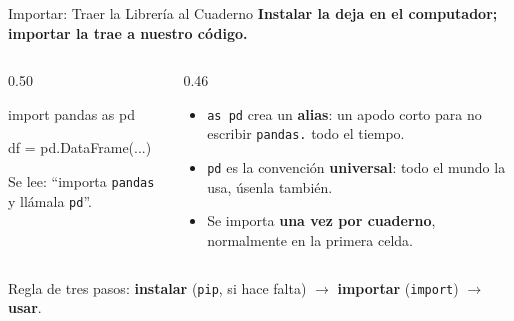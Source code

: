 \documentclass[aspectratio=169, 11pt]{beamer}
\begin{document}
\begin{frame}[fragile,shrink=10]{Importar: Traer la Librería al Cuaderno}
  \vspace{-4pt}
  {\small\color{arcaDark}\bfseries
    Instalar la deja en el computador; \textbf{importar} la trae a nuestro código.}

  \vspace{6pt}
  \begin{columns}[T]
    \begin{column}{0.50\textwidth}
      \begin{pyblock}
import pandas as pd

df = pd.DataFrame(...)
      \end{pyblock}
      \vspace{4pt}
      {\scriptsize\color{textMuted}
        Se lee: ``importa \texttt{pandas} y llámala \texttt{pd}''.}
    \end{column}

    \begin{column}{0.46\textwidth}
      {\scriptsize\color{textMuted}
      \begin{itemize}\setlength{\itemsep}{5pt}
        \item[{\color{arcaRed}\scriptsize\faArrowRight}]
          \texttt{as pd} crea un \textbf{alias}: un
          apodo corto para no escribir
          \texttt{pandas.} todo el tiempo.
        \item[{\color{arcaRed}\scriptsize\faArrowRight}]
          \texttt{pd} es la convención \textbf{universal}:
          todo el mundo la usa, úsenla también.
        \item[{\color{arcaRed}\scriptsize\faArrowRight}]
          Se importa \textbf{una vez por cuaderno},
          normalmente en la primera celda.
      \end{itemize}
      }
    \end{column}
  \end{columns}

  \vspace{6pt}
  {\footnotesize\color{arcaDark}
    \faLightbulb[regular]\hspace{4pt}%
    Regla de tres pasos: \textbf{instalar} (\texttt{pip}, si hace falta) \(\to\) \textbf{importar} (\texttt{import}) \(\to\) \textbf{usar}.}
\end{frame}
\end{document}
